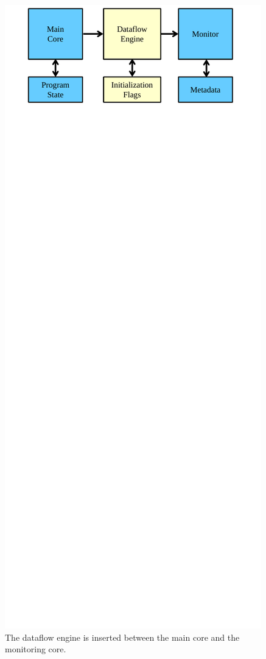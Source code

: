 \begin{figure}
  \begin{center}
    \includegraphics[width=\columnwidth]{figs/dataflow_overview.pdf}
    \vspace{-0.2in}
    \caption{The dataflow engine is inserted between the main core and the monitoring core.}
    \label{fig:filter.overview} 
    \vspace{-0.1in}
  \end{center}
\end{figure}

